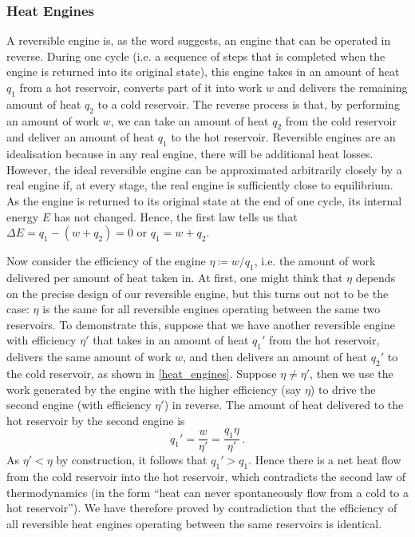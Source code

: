 \documentclass{article}
\theoremstyle{plain}\theoremheaderfont{\normalfont\bfseries}\theorembodyfont{\rmfamily}\theoremseparator{.}\newtheorem*{thm}{Theorem}\newtheorem*{law}{Law}\newtheorem*{pos}{Postulate}
\numberwithin{equation}{section}
\begin{document}
    \subsubsection{Heat Engines}
    A reversible engine is, as the word suggests, an engine that can be operated in reverse. During one cycle (i.e. a sequence of steps that is completed when the engine is returned into its original state), this engine takes in an amount of heat \(q_1\) from a hot reservoir, converts part of it into work \(w\) and delivers the remaining amount of heat \(q_2\) to a cold reservoir. The reverse process is that, by performing an amount of work \(w\), we can take an amount of heat \(q_2\) from the cold reservoir and deliver an amount of heat \(q_1\) to the hot reservoir. Reversible engines are an idealisation because in any real engine, there will be additional heat losses. However, the ideal reversible engine can be approximated arbitrarily closely by a real engine if, at every stage, the real engine is sufficiently close to equilibrium. As the engine is returned to its original state at the end of one cycle, its internal energy \(E\) has not changed. Hence, the first law tells us that \(\Delta E=q_1-(w+q_2)=0\) or \(q_1=w+q_2\).

    Now consider the efficiency of the engine \(\eta\coloneqq w/q_1\), i.e. the amount of work delivered per amount of heat taken in. At first, one might think that \(\eta\) depends on the precise design of our reversible engine, but this turns out not to be the case: \(\eta\) is the same for all reversible engines operating between the same two reservoirs. To demonstrate this, suppose that we have another reversible engine with efficiency \(\eta'\) that takes in an amount of heat \(q_1'\) from the hot reservoir, delivers the same amount of work \(w\), and then delivers an amount of heat \(q_2'\) to the cold reservoir, as shown in \cref{heat_engines}. Suppose \(\eta\ne\eta'\), then we use the work generated by the engine with the higher efficiency (say \(\eta\)) to drive the second engine (with efficiency \(\eta'\)) in reverse. The amount of heat delivered to the hot reservoir by the second engine is
    \begin{equation}
        q_1'=\frac{w}{\eta'}=\frac{q_1\eta}{\eta'}\,.
    \end{equation}
    As \(\eta'<\eta\) by construction, it follows that \(q_1'>q_1\). Hence there is a net heat flow from the cold reservoir into the hot reservoir, which contradicts the second law of thermodynamics (in the form ``heat can never spontaneously flow from a cold to a hot reservoir''). We have therefore proved by contradiction that the efficiency of all reversible heat engines operating between the same reservoirs is identical.
\end{document}
